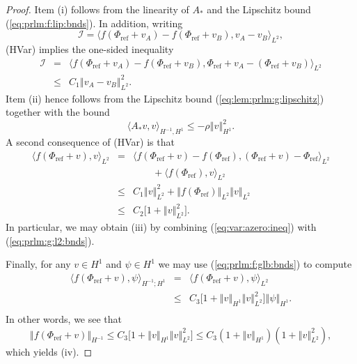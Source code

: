 \documentclass[10pt]{articleHJ}
\newcommand{\norm}[1]{\left\Vert#1\right\Vert}		%
\newcommand{\sref}[1]{(\ref{#1})}                       %
\numberwithin{equation}{section}
\begin{document}
\begin{proof}
Item (i) follows from the linearity of $A_*$ and
the Lipschitz bound \sref{eq:prlm:f:lip:bnds}.
In addition,
writing
\begin{equation}
\mathcal{I} =
\langle f(\Phi_{\mathrm{ref}} + v_A)
  - f(\Phi_{\mathrm{ref}} + v_B), v_A - v_B \rangle_{L^2},
\end{equation}
(HVar) implies the one-sided inequality
\begin{equation}
\begin{array}{lcl}
\mathcal{I}
&  = &
\langle f(\Phi_{\mathrm{ref}} + v_A) - f(\Phi_{\mathrm{ref}} + v_B),
     \Phi_{\mathrm{ref}} + v_A - (\Phi_{\mathrm{ref}} +v_B) \rangle_{L^2}
\\[0.2cm]
& \le & C_1 \norm{v_A - v_B}_{L^2}^2.
\end{array}
\end{equation}
Item (ii) hence follows from
the Lipschitz bound
\sref{eq:lem:prlm:g:lipschitz}
together with the bound
\begin{equation}
\label{eq:var:azero:ineq}
\langle A_* v, v \rangle_{H^{-1}, H^1}
\le - \rho \norm{v}_{H^1}^2.
\end{equation}
A second consequence of (HVar)
is that
\begin{equation}
\begin{array}{lcl}
\langle f(\Phi_{\mathrm{ref}} + v), v \rangle_{L^2}
& = &
  \langle f(\Phi_{\mathrm{ref}} + v) - f(\Phi_{\mathrm{ref}}) , (\Phi_{\mathrm{ref}} + v) - \Phi_{\mathrm{ref}} \rangle_{L^2}
\\[0.2cm]
& & \qquad
  + \langle f(\Phi_{\mathrm{ref}}) , v \rangle_{L^2}
\\[0.2cm]
& \le &
  C_1 \norm{v}_{L^2}^2 + \norm{f(\Phi_{\mathrm{ref}})}_{L^2} \norm{v}_{L^2}
\\[0.2cm]
& \le &
  C_2 \big[ 1 + \norm{v}_{L^2}^2 \big] .
\end{array}
\end{equation}
In particular, we may obtain
(iii) by combining
\sref{eq:var:azero:ineq}
with \sref{eq:prlm:g:l2:bnds}.

Finally,
for any $v \in H^1$ and $\psi \in H^1$
we may use
\sref{eq:prlm:f:glb:bnds}
to compute
\begin{equation}
\begin{array}{lcl}
\langle f(\Phi_{\mathrm{ref}} + v) ,
   \psi \rangle_{H^{-1} ; H^1}
& = &
  \langle f(\Phi_{\mathrm{ref}} + v) ,
   \psi \rangle_{ L^2}
\\[0.2cm]
& \le &
 C_3
 \Big[ 1
   + \norm{v}_{H^1} \norm{v}_{L^2}^2
 \Big] \norm{\psi}_{H^1} .
\\[0.2cm]
\end{array}
\end{equation}
In other words, we see that
\begin{equation}
\norm{f(\Phi_{\mathrm{ref}} + v)}_{H^{-1}} \le
C_3
\big[ 1 + \norm{v}_{H^1} \norm{v}_{L^2}^2  \big]
\le C_3 ( 1 + \norm{v}_{H^1} )
  ( 1 + \norm{v}_{L^2}^2  ),
\end{equation}
which yields (iv).
\end{proof}
\end{document}
